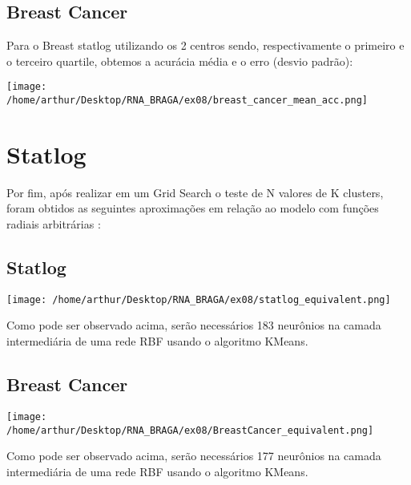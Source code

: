 \documentclass{article}
\begin{document}
\vspace{10pt}

\subsection{Breast Cancer}

\vspace{10pt}

Para o Breast statlog utilizando os 2 centros sendo, respectivamente o primeiro e o terceiro quartile, obtemos a acurácia média e o erro (desvio padrão): 

\vspace{10pt}

\begin{center}

\texttt{[image: /home/arthur/Desktop/RNA\_BRAGA/ex08/breast\_cancer\_mean\_acc.png]}
            
\end{center}

\vspace{10pt}



\section{Statlog}
\vspace{10pt}

Por fim, após realizar em um Grid Search o teste de N valores de K clusters, foram obtidos as seguintes aproximações em relação ao modelo com funções radiais arbitrárias : 

\vspace{10pt}

\subsection{Statlog}

\vspace{10pt}


\begin{center}

\texttt{[image: /home/arthur/Desktop/RNA\_BRAGA/ex08/statlog\_equivalent.png]}
                
\end{center}

Como pode ser observado acima, serão necessários 183 neurônios na camada intermediária de uma rede RBF usando o algoritmo KMeans.


\subsection{Breast Cancer}

\vspace{10pt}

\begin{center}

\texttt{[image: /home/arthur/Desktop/RNA\_BRAGA/ex08/BreastCancer\_equivalent.png]}
                
\end{center}

Como pode ser observado acima, serão necessários 177 neurônios na camada intermediária de uma rede RBF usando o algoritmo KMeans.
\end{document}
